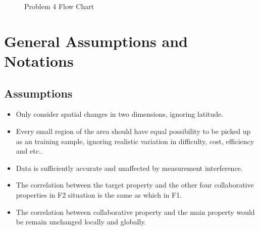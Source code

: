 \documentclass{swmcmthesis}
\begin{document}
\begin{figure}[h!t]
\begin{minipage}[t]{0.4\textwidth}
		\caption{Problem 4 Flow Chart}
	\end{minipage}
\end{figure}


\section{General Assumptions and Notations}
\subsection{Assumptions}
\begin{itemize}
    \item Only consider spatial changes in two dimensions, ignoring latitude.
    \item  Every small region of the area should have equal possibility to be picked up as an training sample, ignoring realistic variation in difficulty, cost, efficiency and etc..
    \item Data is sufficiently accurate and unaffected by measurement interference.
    \item The correlation between the target property and the other four collaborative properties in F2 situation is the same as which in F1.
    \item The correlation between collaborative property and the main property would be remain unchanged locally and globally.
\end{itemize}
\end{document}
